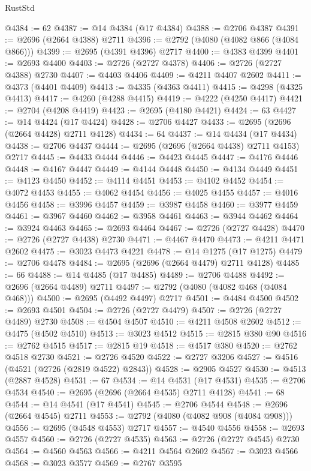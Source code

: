 \begin{lexlean}{RustStd}
\begin{coremodule}
@4384 := 62
@4387 := @14 @4384 (@17 @4384)
@4388 := @2706 @4387
@4391 := @2696 (@2664 @4388) @2711
@4396 := @2792 (@4080 (@4082 @866 (@4084 @866)))
@4399 := @2695 (@4391 @4396) @2717
@4400 := @4383 @4399
@4401 := @2693 @4400
@4403 := @2726 (@2727 @4378)
@4406 := @2726 (@2727 @4388) @2730
@4407 := @4403 @4406
@4409 := @4211 @4407 @2602
@4411 := @4373 (@4401 @4409)
@4413 := @4335 (@4363 @4411)
@4415 := @4298 (@4325 @4413)
@4417 := @4260 (@4288 @4415)
@4419 := @4222 (@4250 @4417)
@4421 := @2704 (@4208 @4419)
@4423 := @2695 (@4180 @4421)
@4424 := 63
@4427 := @14 @4424 (@17 @4424)
@4428 := @2706 @4427
@4433 := @2695 (@2696 (@2664 @4428) @2711 @4128)
@4434 := 64
@4437 := @14 @4434 (@17 @4434)
@4438 := @2706 @4437
@4444 := @2695 (@2696 (@2664 @4438) @2711 @4153) @2717
@4445 := @4433 @4444
@4446 := @4423 @4445
@4447 := @4176 @4446
@4448 := @4167 @4447
@4449 := @4144 @4448
@4450 := @4134 @4449
@4451 := @4123 @4450
@4452 := @4114 @4451
@4453 := @4102 @4452
@4454 := @4072 @4453
@4455 := @4062 @4454
@4456 := @4025 @4455
@4457 := @4016 @4456
@4458 := @3996 @4457
@4459 := @3987 @4458
@4460 := @3977 @4459
@4461 := @3967 @4460
@4462 := @3958 @4461
@4463 := @3944 @4462
@4464 := @3924 @4463
@4465 := @2693 @4464
@4467 := @2726 (@2727 @4428)
@4470 := @2726 (@2727 @4438) @2730
@4471 := @4467 @4470
@4473 := @4211 @4471 @2602
@4475 := @3023 @4473 @4221
@4478 := @14 @1275 (@17 @1275)
@4479 := @2706 @4478
@4484 := @2695 (@2696 (@2664 @4479) @2711 @4128)
@4485 := 66
@4488 := @14 @4485 (@17 @4485)
@4489 := @2706 @4488
@4492 := @2696 (@2664 @4489) @2711
@4497 := @2792 (@4080 (@4082 @468 (@4084 @468)))
@4500 := @2695 (@4492 @4497) @2717
@4501 := @4484 @4500
@4502 := @2693 @4501
@4504 := @2726 (@2727 @4479)
@4507 := @2726 (@2727 @4489) @2730
@4508 := @4504 @4507
@4510 := @4211 @4508 @2602
@4512 := @4475 (@4502 @4510)
@4513 := @3023 @4512
@4515 := @2815 @380 @90
@4516 := @2762 @4515
@4517 := @2815 @19
@4518 := @4517 @380
@4520 := @2762 @4518 @2730
@4521 := @2726 @4520
@4522 := @2727 @3206
@4527 := @4516 (@4521 (@2726 (@2819 @4522) @2843))
@4528 := @2905 @4527
@4530 := @4513 (@2887 @4528)
@4531 := 67
@4534 := @14 @4531 (@17 @4531)
@4535 := @2706 @4534
@4540 := @2695 (@2696 (@2664 @4535) @2711 @4128)
@4541 := 68
@4544 := @14 @4541 (@17 @4541)
@4545 := @2706 @4544
@4548 := @2696 (@2664 @4545) @2711
@4553 := @2792 (@4080 (@4082 @908 (@4084 @908)))
@4556 := @2695 (@4548 @4553) @2717
@4557 := @4540 @4556
@4558 := @2693 @4557
@4560 := @2726 (@2727 @4535)
@4563 := @2726 (@2727 @4545) @2730
@4564 := @4560 @4563
@4566 := @4211 @4564 @2602
@4567 := @3023 @4566
@4568 := @3023 @3577
@4569 := @2767 @3595

\end{coremodule}
\end{lexlean}
